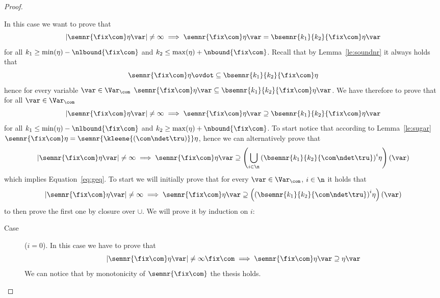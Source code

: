 \begin{proof}
\begin{inductive}
    \case{\(\fix\com\)} In this case we want to prove that
    \begin{equation*}
      |\semnr{\fix\com}\eta\var| \neq \infty \implies \semnr{\fix\com}\eta\var = \bsemnr{k_1}{k_2}{\fix\com}\eta\var
    \end{equation*}
    for all \(k_1 \geq \min(\eta) - \nlbound{\fix\com}\) and
    \(k_2 \leq \max(\eta) + \nbound{\fix\com}\). Recall that by
    Lemma~\ref{le:soundnr} it always holds that
    \begin{equation*}
      \semnr{\fix\com}\eta \ovdot\subseteq \bsemnr{k_1}{k_2}{\fix\com}\eta
    \end{equation*}
    hence for every variable \(\var \in \Var_{\com}\)
    \(\semnr{\fix\com}\eta\var \subseteq
    \bsemnr{k_1}{k_2}{\fix\com}\eta\var\). We have therefore to prove
    that for all \(\var\in \Var_{\com}\)
    \begin{equation}\label{eq:geq}
      |\semnr{\fix\com}\eta\var| \neq \infty \implies \semnr{\fix\com}\eta\var \supseteq \bsemnr{k_1}{k_2}{\fix\com}\eta\var
    \end{equation}
    for all \(k_1 \leq \min(\eta) - \nlbound{\fix\com}\) and
    \(k_2 \geq \max(\eta) + \nbound{\fix\com}\). To start notice that
    according to Lemma~\ref{le:sugar}
    \(\semnr{\fix\com}\eta = \semnr{\kleene{(\com\ndet\tru)}}\eta\),
    hence we can alternatively prove that
    \begin{equation*}
      |\semnr{\fix\com}\eta\var| \neq \infty \implies \semnr{\fix\com}\eta\var \supseteq \left(\bigcup_{i\in\n} {\left(\bsemnr{k_1}{k_2}{\com \ndet \tru}\right)}^i\eta\right)(\var)
    \end{equation*}
    which implies Equation~\ref{eq:geq}. To start we will initially
    prove that for every \(\var\in\Var_{\com}\), \(i\in\n\) it holds
    that
    \begin{equation*}
      |\semnr{\fix\com}\eta\var| \neq \infty \implies
      \semnr{\fix\com}\eta\var \supseteq
      \left({\left(\bsemnr{k_1}{k_2}{\com \ndet \tru}\right)}^i\eta\right)(\var)
    \end{equation*}
    to then prove the first one by closure over \(\cup\). We will
    prove it by induction on \(i\):
    \begin{description}
      
    \item[Case] (\(i=0\)). In this case we have to prove that
      \[|\semnr{\fix\com}\eta\var| \neq \infty\fix\com \implies
        \semnr{\fix\com}\eta\var \supseteq \eta\var\] We can notice
      that by monotonicity of \(\semnr{\fix\com}\) the thesis holds.
      

\end{description}
\end{inductive}
\end{proof}
